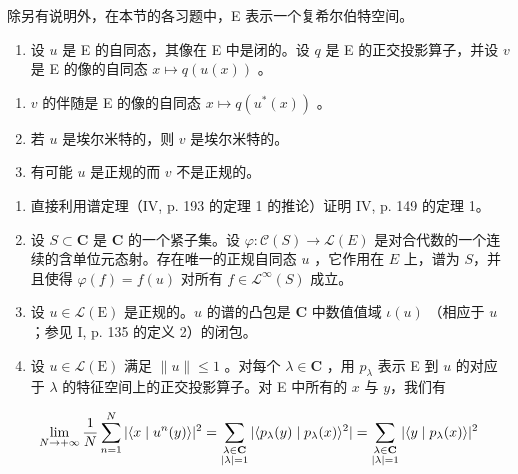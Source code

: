 \exercisesection{}

除另有说明外，在本节的各习题中，E 表示一个复希尔伯特空间。

\begin{enumerate}
\def\labelenumi{\arabic{enumi})}
\tightlist
\item
  设 \(u\) 是 E 的自同态，其像在 E 中是闭的。设 \(q\) 是 E 的正交投影算子，并设 \(v\) 是 E 的像的自同态 \(x \mapsto q(u(x))\) 。
\end{enumerate}

\begin{enumerate}
\def\labelenumi{\alph{enumi})}
\item
  \(v\) 的伴随是 E 的像的自同态 \(x \mapsto q(u^{*}(x))\) 。
\item
  若 \(u\) 是埃尔米特的，则 \(v\) 是埃尔米特的。
\item
  有可能 \(u\) 是正规的而 \(v\) 不是正规的。
\end{enumerate}

\begin{enumerate}
\def\labelenumi{\arabic{enumi})}
\setcounter{enumi}{1}
\item
  直接利用谱定理（IV, p. 193 的定理 1 的推论）证明 IV, p. 149 的定理 1。
\item
  设 \(S \subset \mathbf{C}\) 是 \(\mathbf{C}\) 的一个紧子集。设 \(\varphi \colon \mathcal{C}(S) \to \mathcal{L}(E)\) 是对合代数的一个连续的含单位元态射。存在唯一的正规自同态 \(u\) ，它作用在 \(E\) 上，谱为 \(S\)，并且使得 \(\varphi(f) = f(u)\) 对所有 \(f \in \mathcal{L}^{\infty}(S)\) 成立。
\item
  设 \(u \in \mathcal{L}(\mathrm{E})\) 是正规的。\(u\) 的谱的凸包是 \(\mathbf{C}\) 中数值值域 \(\iota(u)\) （相应于 \(u\) ；参见 I, p. 135 的定义 2）的闭包。
\item
  设 \(u \in \mathcal{L}(\mathrm{E})\) 满足 \(\| u \| \leqslant 1\) 。对每个 \(\lambda \in \mathbf{C}\) ，用 \(p_{\lambda}\) 表示 E 到 \(u\) 的对应于 \(\lambda\) 的特征空间上的正交投影算子。对 E 中所有的 \(x\) 与 \(y\)，我们有
\end{enumerate}

\[
\lim_{N\to +\infty}\frac{1}{N}\sum_{n = 1}^{N}|\langle x \mid u^{n}(y)\rangle |^{2} = \sum_{\substack{\lambda \in \mathbf{C}\\ |\lambda | = 1}}|\langle p_{\lambda}(y) \mid p_{\lambda}(x)\rangle^{2}|\\ = \sum_{\substack{\lambda \in \mathbf{C}\\ |\lambda | = 1}}|\langle y \mid p_{\lambda}(x)\rangle |^{2}
\]

